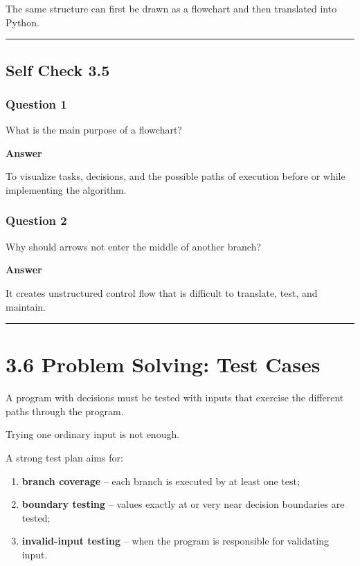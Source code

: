 \documentclass[
  11pt,
  a4paper,
]{article}
\providecommand{\tightlist}{%
  \setlength{\itemsep}{0pt}\setlength{\parskip}{0pt}}
\begin{document}
The same structure can first be drawn as a flowchart and then translated
into Python.

\begin{center}\rule{0.5\linewidth}{0.5pt}\end{center}

\subsection{Self Check 3.5}\label{self-check-3.5}

\subsubsection{Question 1}\label{question-1-4}

What is the main purpose of a flowchart?

\textbf{Answer}

To visualize tasks, decisions, and the possible paths of execution
before or while implementing the algorithm.

\subsubsection{Question 2}\label{question-2-4}

Why should arrows not enter the middle of another branch?

\textbf{Answer}

It creates unstructured control flow that is difficult to translate,
test, and maintain.

\begin{center}\rule{0.5\linewidth}{0.5pt}\end{center}

\section{3.6 Problem Solving: Test
Cases}\label{problem-solving-test-cases}

A program with decisions must be tested with inputs that exercise the
different paths through the program.

Trying one ordinary input is not enough.

A strong test plan aims for:

\begin{enumerate}
\def\labelenumi{\arabic{enumi}.}
\tightlist
\item
  \textbf{branch coverage} -- each branch is executed by at least one
  test;
\item
  \textbf{boundary testing} -- values exactly at or very near decision
  boundaries are tested;
\item
  \textbf{invalid-input testing} -- when the program is responsible for
  validating input.
\end{enumerate}
\end{document}
